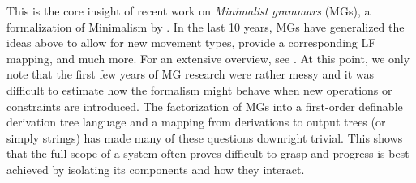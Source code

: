 This is the core insight of recent work on \emph{Minimalist grammars} (MGs), a formalization of Minimalism by \citet{Stabler97}.
In the last 10 years, MGs have generalized the ideas above to allow for new movement types, provide a corresponding LF mapping, and much more.
For an extensive overview, see \citet{Graf13Thesis}.
At this point, we only note that the first few years of MG research were rather messy and it was difficult to estimate how the formalism might behave when new operations or constraints are introduced.
The factorization of MGs into a first-order definable derivation tree language and a mapping from derivations to output trees (or simply strings) has made many of these questions downright trivial.
This shows that the full scope of a system often proves difficult to grasp and progress is best achieved by isolating its components and how they interact.

